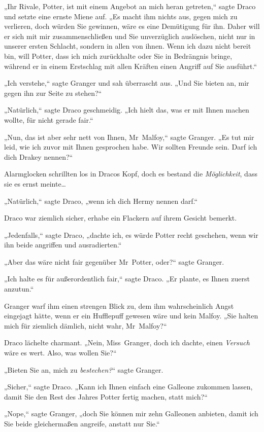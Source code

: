 {„Ihr Rivale, Potter, ist mit einem Angebot an mich heran getreten,“ sagte Draco und setzte eine ernste Miene auf. „Es macht ihm nichts aus, gegen mich zu verlieren, doch würden Sie gewinnen, wäre es eine Demütigung für ihn. Daher will er sich mit mir zusammenschließen und Sie unverzüglich auslöschen, nicht nur in unserer ersten Schlacht, sondern in allen von ihnen. Wenn ich dazu nicht bereit bin, will Potter, dass ich mich zurückhalte oder Sie in Bedrängnis bringe, während er in einem Erstschlag mit allen Kräften einen Angriff auf Sie ausführt.“

„Ich verstehe,“ sagte Granger und sah überrascht aus. „Und Sie bieten an, mir gegen ihn zur Seite zu stehen?“

„Natürlich,“ sagte Draco geschmeidig. „Ich hielt das, was er mit Ihnen machen wollte, für nicht gerade fair.“

„Nun, das ist aber sehr nett von Ihnen, Mr~Malfoy,“ sagte Granger. „Es tut mir leid, wie ich zuvor mit Ihnen gesprochen habe. Wir sollten Freunde sein. Darf ich dich Drakey nennen?“

Alarmglocken schrillten los in Dracos Kopf, doch es bestand die \emph{Möglichkeit}, dass sie es ernst meinte…

„Natürlich,“ sagte Draco, „wenn ich dich Hermy nennen darf.“

Draco war ziemlich sicher, erhabe ein Flackern auf ihrem Gesicht bemerkt.

„Jedenfalls,“ sagte Draco, „dachte ich, es würde Potter recht geschehen, wenn wir ihn beide angriffen und ausradierten.“

„Aber das wäre nicht fair gegenüber Mr~Potter, oder?“ sagte Granger.

„Ich halte es für außerordentlich fair,“ sagte Draco. „Er plante, es Ihnen zuerst anzutun.“

Granger warf ihm einen strengen Blick zu, dem ihm wahrscheinlich Angst eingejagt hätte, wenn er ein Hufflepuff gewesen wäre und kein Malfoy. „Sie halten mich für ziemlich dämlich, nicht wahr, Mr~Malfoy?“

Draco lächelte charmant. „Nein, Miss~Granger, doch ich dachte, einen \emph{Versuch} wäre es wert. Also, was wollen Sie?“

„Bieten Sie an, mich zu \emph{bestechen?}“ sagte Granger.

„Sicher,“ sagte Draco. „Kann ich Ihnen einfach eine Galleone zukommen lassen, damit Sie den Rest des Jahres Potter fertig machen, statt mich?“

„Nope,“ sagte Granger, „doch Sie können mir zehn Galleonen anbieten, damit ich Sie beide gleichermaßen angreife, anstatt nur Sie.“

}
